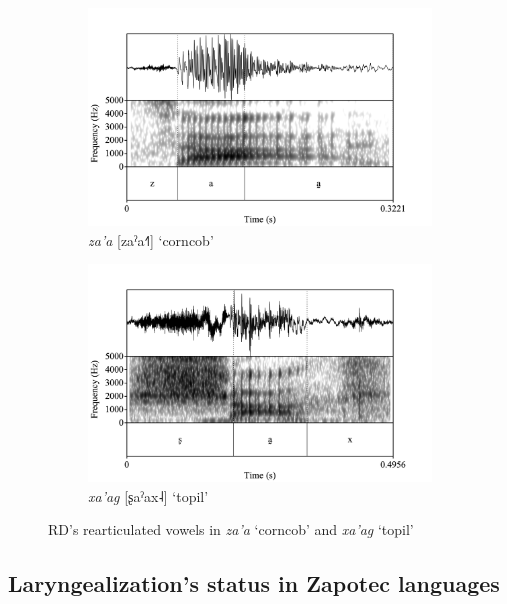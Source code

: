 \begin{figure}[h!]
	\centering
	\begin{subfigure}{.5\textwidth}
		\centering
		\includegraphics[width=\linewidth]{Images/Spectrograms/RD_za'a.png}
		\caption{\textit{za'a} [zaˀa˧˥] `corncob'}
		\label{fig:RDza'a}
	\end{subfigure}%
	\begin{subfigure}{.5\textwidth}
		\centering
		\includegraphics[width=\linewidth]{Images/Spectrograms/RD_xa'ag.png}
		\caption{\textit{xa'ag} [ʂaˀax˨] `topil'}
		\label{fig:RDxa'ag}
	\end{subfigure}
	\caption{RD's rearticulated vowels in \textit{za'a} `corncob' and \textit{xa'ag} `topil'}
	\label{fig:RDLaryngeal}
\end{figure}


\subsection{Laryngealization's status in Zapotec languages} \label{sec:laryngeal_status}


